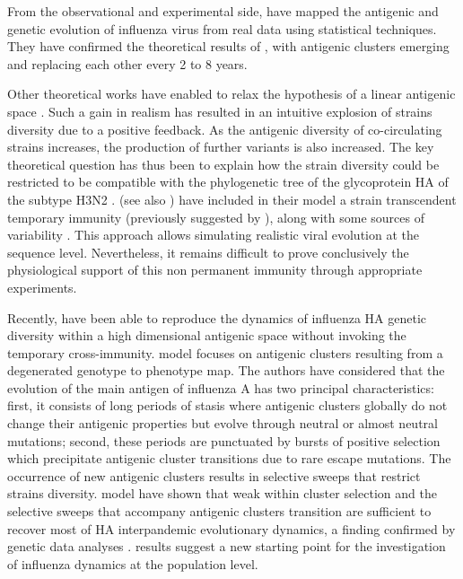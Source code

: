 From the observational and experimental side, \citet{Smith2004} have
mapped the antigenic and genetic evolution of influenza virus from
real data using statistical techniques. They have confirmed the
theoretical results of \citet{Gog2002}, with antigenic clusters
emerging and replacing each other every 2 to 8 years.


Other theoretical works have enabled to relax the hypothesis of a
linear antigenic space \citep{Ferguson2003, Girvan2002}. Such a gain
in realism has resulted in an intuitive explosion of strains diversity
due to a positive feedback. As the antigenic diversity of
co-circulating strains increases, the production of further variants
is also increased. The key theoretical question has thus been to
explain how the strain diversity could be restricted to be compatible
with the phylogenetic tree of the glycoprotein HA of the subtype H3N2
\citep{Grenfell2004}. \citet{Ferguson2003} (see also
\citet{Andreasen2006, Minayev2008}) have included in their model a
strain transcendent temporary immunity (previously suggested by
\citet{Webster1992}), along with some sources of variability
\citep{Tria2005}. This approach allows simulating realistic viral
evolution at the sequence level. Nevertheless, it remains difficult to
prove conclusively the physiological support of this non permanent
immunity through appropriate experiments.

Recently, \citet{Koelle2006} have been able to reproduce the dynamics
of influenza HA genetic diversity within a high dimensional antigenic
space without invoking the temporary cross-immunity.
\citet{Koelle2006} model focuses on antigenic clusters resulting from
a degenerated genotype to phenotype map. The authors have considered
that the evolution of the main antigen of influenza A has two
principal characteristics: first, it consists of long periods of
stasis where antigenic clusters globally do not change their antigenic
properties but evolve through neutral or almost neutral mutations;
second, these periods are punctuated by bursts of positive selection
which precipitate antigenic cluster transitions due to rare escape
mutations. The occurrence of new antigenic clusters results in
selective sweeps that restrict strains diversity. \citet{Koelle2006}
model have shown that weak within cluster selection and the selective
sweeps that accompany antigenic clusters transition are sufficient to
recover most of HA interpandemic evolutionary dynamics, a finding
confirmed by genetic data analyses \citep{Blackburne2008, Wolf2006}.
\citet{Koelle2006} results suggest a new starting point for the
investigation of influenza dynamics at the population level. 
\vspace{1cm}

